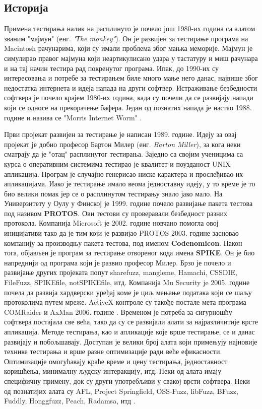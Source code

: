 \documentclass[12pt,oneside]{memoir}
\begin{document}
\subsection{Историја}
\label{subsec:history}

Примена тестирања налик на расплинуто је почело још 1980-их година са алатом званим "мајмун" (енг. \textit{"Тhe monkey"}). Он је развијен за тестирање програма на Macintosh рачунарима, који су имали проблема због мањка меморије. Мајмун је симулирао правог мајмуна који неартикулисано удара у тастатуру и миш рачунара и на тај начин тестира рад покренутог програма. Ипак, до 1990-их су интересовања и потребе за тестирањем биле много мање него данас, највише због недостатка интернета и идеја напада на други софтвер. Истраживање безбедности софтвера је почело крајем 1980-их година, када су почели да се развијају напади који се односе на прекорачење бафера. Један од познатих напада је настао 1988. године и назива се "Morris Internet Worm" \cite{fuzzingBrute, fuzzing}. 

Први пројекат развијен за тестирање је написан 1989. године. Идеју за овај пројекат је добио професор Бартон Милер (енг. \textit{Barton Miller}), за кога неки сматрају да је "отац" расплинутог тестирања. Заједно са својим ученицима са курса о оперативним системима тестирао је квалитет и поузданост UNIX апликација. Програм је случајно генерисао ниске карактера и прослеђивао их апликацијама. Иако је тестирање имало веома једноставну идеју, у то време је то био велики помак јер се о расплинутом тестирању знало јако мало. На Универзитету у Оулу у Финској је 1999. године почело развијање пакета тестова под називом \textbf{PROTOS}. Ови тестови су проверавали безбедност разних протокола. Компанија Microsoft је 2002. године новчано помогла овој иницијативи тако да је тим који је развијао PROTOS 2003. године засновао компанију за производњу пакета тестова, под именом \textbf{Codenomicon}. Након тога, објављен је програм за тестирање отвореног кода имена \textbf{SPIKE}. Он је био напреднији од програма који је развио професор Милер. Брзо је почело и развијање других пројеката попут sharefuzz, mangleme, Hamachi, CSSDIE, FileFuzz, SPIKEfile, notSPIKEfile, итд. Компанија Mu Security je 2005. године почела да развија хардверски уређај коме је циљ мењање података који се шаљу протоколима путем мреже. ActiveX контроле су такође постале мета програма COMRaider и AxMan 2006. године \cite{fuzzingBrute, fuzzing}. Временом је потреба за сигурношћу софтвера постајала све већа, тако да су се развијали алати за најразличитије врсте апликација. Методе тестирања, као и апликације које врше тестирање, се и данас развијају и побољшавају. Доступан је велики број алата који примењују најновије технике тестирања и врше разне оптимизације ради веће ефикасности. Оптимизације омогућавају краће време и цену тестирања, једноставност коришћења, минималну људску интеракцију, итд. Неки од алата имају специфичну примену, док су други употребљиви у свакој врсти софтвера. Неки од познатијих алата су AFL, Project Springfield, OSS-Fuzz, libFuzz, BFuzz, Fuddly, Honggfuzz, Peach, Radamsa, итд \cite{bestFuzzers, fuzzingBrute, fuzzing}. 
\end{document}
